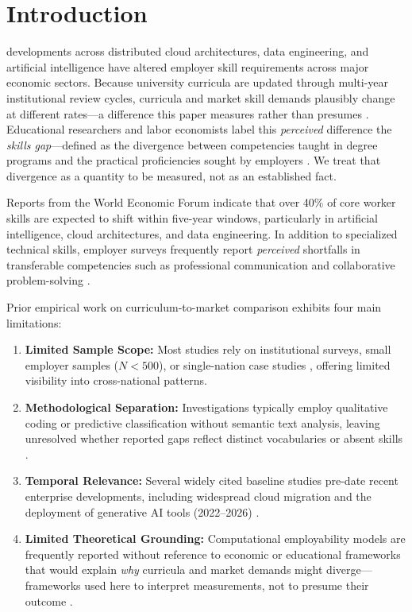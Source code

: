 \documentclass[journal]{IEEEtran}
\begin{document}
\section{Introduction}
\label{sec:introduction}

 developments across distributed cloud architectures, data engineering, and artificial intelligence have altered employer skill requirements across major economic sectors. Because university curricula are updated through multi-year institutional review cycles, curricula and market skill demands plausibly change at different rates---a difference this paper measures rather than presumes \cite{jaiswal2024understanding, jumaan2026understanding}. Educational researchers and labor economists label this \textit{perceived} difference the \textit{skills gap}---defined as the divergence between competencies taught in degree programs and the practical proficiencies sought by employers \cite{febriani2025employability, barachino2025operationalization}. We treat that divergence as a quantity to be measured, not as an established fact.

Reports from the World Economic Forum \cite{wef2020} indicate that over 40\% of core worker skills are expected to shift within five-year windows, particularly in artificial intelligence, cloud architectures, and data engineering. In addition to specialized technical skills, employer surveys frequently report \textit{perceived} shortfalls in transferable competencies such as professional communication and collaborative problem-solving \cite{tight2023employability, braun2026concept, noor2024skills}. 

Prior empirical work on curriculum-to-market comparison exhibits four main limitations:
\begin{enumerate}[label=(\arabic*)]
    \item \textbf{Limited Sample Scope:} Most studies rely on institutional surveys, small employer samples ($N < 500$), or single-nation case studies \cite{baral2026analyzing, alhazmi2025aligning}, offering limited visibility into cross-national patterns.
    \item \textbf{Methodological Separation:} Investigations typically employ qualitative coding \cite{rikala2024understanding} or predictive classification without semantic text analysis, leaving unresolved whether reported gaps reflect distinct vocabularies or absent skills \cite{kruger2025improving, lai2025learning}.
    \item \textbf{Temporal Relevance:} Several widely cited baseline studies pre-date recent enterprise developments, including widespread cloud migration and the deployment of generative AI tools (2022--2026) \cite{anthuvan2026reverse, sun2025creative}.
    \item \textbf{Limited Theoretical Grounding:} Computational employability models are frequently reported without reference to economic or educational frameworks that would explain \textit{why} curricula and market demands might diverge---frameworks used here to interpret measurements, not to presume their outcome \cite{schlippe2023skill, eimer2023employability}.
\end{enumerate}
\end{document}
